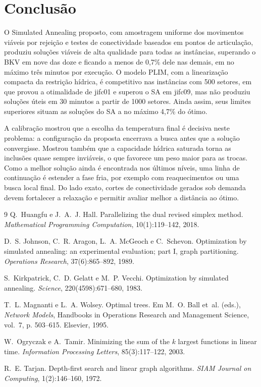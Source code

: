 \documentclass[11pt,a4paper]{article}
\begin{document}
\section{Conclusão}

O Simulated Annealing proposto, com amostragem uniforme dos movimentos
viáveis por rejeição e testes de conectividade baseados em pontos de
articulação, produziu soluções viáveis de alta qualidade para todas as
instâncias, superando o BKV em nove das doze e ficando a menos de 0{,}7\% dele
nas demais, em no máximo três minutos por execução. O modelo PLIM, com a
linearização compacta da restrição hídrica, é competitivo nas instâncias com
500 setores, em que provou a otimalidade de jifc01 e superou o SA em jifc09,
mas não produziu soluções úteis em 30 minutos a partir de 1000 setores. Ainda
assim, seus limites superiores situam as soluções do SA a no máximo 4{,}7\%
do ótimo.

A calibração mostrou que a escolha da temperatura final é decisiva neste
problema: a configuração da proposta encerrava a busca antes que a solução
convergisse. Mostrou também que a capacidade hídrica saturada torna as
inclusões quase sempre inviáveis, o que favorece um peso maior para as trocas.
Como a melhor solução ainda é encontrada nos últimos níveis, uma linha de
continuação é estender a fase fria, por exemplo com reaquecimentos ou uma
busca local final. Do lado exato, cortes de conectividade gerados sob demanda
devem fortalecer a relaxação e permitir avaliar melhor a distância ao ótimo.

\begin{thebibliography}{9}
Q.~Huangfu e J.~A.~J. Hall. Parallelizing the dual revised simplex method.
\emph{Mathematical Programming Computation}, 10(1):119--142, 2018.

D.~S. Johnson, C.~R. Aragon, L.~A. McGeoch e C.~Schevon. Optimization by
simulated annealing: an experimental evaluation; part I, graph partitioning.
\emph{Operations Research}, 37(6):865--892, 1989.

S.~Kirkpatrick, C.~D. Gelatt e M.~P. Vecchi. Optimization by simulated
annealing. \emph{Science}, 220(4598):671--680, 1983.

T.~L. Magnanti e L.~A. Wolsey. Optimal trees. Em M.~O. Ball et~al.
(eds.), \emph{Network Models}, Handbooks in Operations Research and
Management Science, vol.~7, p. 503--615. Elsevier, 1995.

W.~Ogryczak e A.~Tamir. Minimizing the sum of the $k$ largest functions in
linear time. \emph{Information Processing Letters}, 85(3):117--122, 2003.

R.~E. Tarjan. Depth-first search and linear graph algorithms. \emph{SIAM
Journal on Computing}, 1(2):146--160, 1972.
\end{thebibliography}
\end{document}
